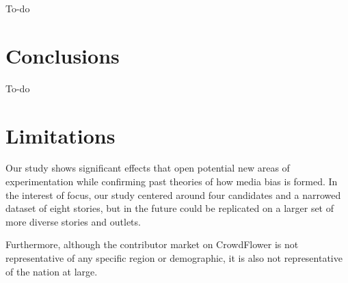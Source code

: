 To-do

\section{Conclusions}

To-do

\section{Limitations}

Our study shows significant effects that open potential new areas of experimentation while confirming past theories of how media bias is formed. In the interest of focus, our study centered around four candidates and a narrowed dataset of eight stories, but in the future could be replicated on a larger set of more diverse stories and outlets. 

Furthermore, although the contributor market on CrowdFlower is not representative of any specific region or demographic, it is also not representative of the nation at large.
